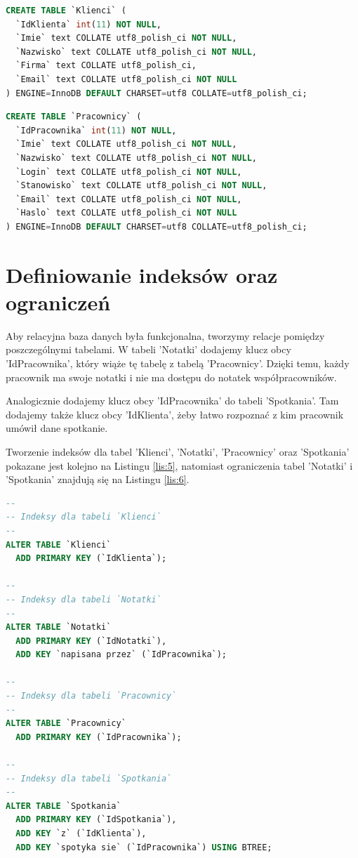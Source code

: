 \documentclass[eng,printmode,openany,oneside]{mgr}
\begin{document}
\begin{lstlisting}[caption={Stworzenie tabeli klientów}, language=SQL, label={lis:3}]
CREATE TABLE `Klienci` (
  `IdKlienta` int(11) NOT NULL,
  `Imie` text COLLATE utf8_polish_ci NOT NULL,
  `Nazwisko` text COLLATE utf8_polish_ci NOT NULL,
  `Firma` text COLLATE utf8_polish_ci,
  `Email` text COLLATE utf8_polish_ci NOT NULL
) ENGINE=InnoDB DEFAULT CHARSET=utf8 COLLATE=utf8_polish_ci;
\end{lstlisting}	
	
\begin{lstlisting}[caption={Stworzenie tabeli pracowników}, language=SQL, label={lis:4}]
CREATE TABLE `Pracownicy` (
  `IdPracownika` int(11) NOT NULL,
  `Imie` text COLLATE utf8_polish_ci NOT NULL,
  `Nazwisko` text COLLATE utf8_polish_ci NOT NULL,
  `Login` text COLLATE utf8_polish_ci NOT NULL,
  `Stanowisko` text COLLATE utf8_polish_ci NOT NULL,
  `Email` text COLLATE utf8_polish_ci NOT NULL,
  `Haslo` text COLLATE utf8_polish_ci NOT NULL
) ENGINE=InnoDB DEFAULT CHARSET=utf8 COLLATE=utf8_polish_ci;
\end{lstlisting}
	
	
	

	
	
	
\section{Definiowanie indeksów oraz ograniczeń}

Aby relacyjna baza danych była funkcjonalna, tworzymy relacje pomiędzy poszczególnymi tabelami. W tabeli 'Notatki' dodajemy klucz obcy 'IdPracownika', który wiąże tę tabelę z tabelą 'Pracownicy'. Dzięki temu, każdy pracownik ma swoje notatki i nie ma dostępu do notatek współpracowników.

Analogicznie dodajemy klucz obcy 'IdPracownika' do tabeli 'Spotkania'. Tam dodajemy także klucz obcy 'IdKlienta', żeby łatwo rozpoznać z kim pracownik umówił dane spotkanie.

Tworzenie indeksów dla tabel 'Klienci', 'Notatki', 'Pracownicy' oraz 'Spotkania' pokazane jest kolejno na Listingu \ref{lis:5}, natomiast ograniczenia tabel 'Notatki' i 'Spotkania' znajdują się na Listingu \ref{lis:6}.
	
	
\begin{lstlisting}[caption={Tworzenie indeksów dla tabel}, language=SQL, label={lis:5}]
--
-- Indeksy dla tabeli `Klienci`
--
ALTER TABLE `Klienci`
  ADD PRIMARY KEY (`IdKlienta`);

--
-- Indeksy dla tabeli `Notatki`
--
ALTER TABLE `Notatki`
  ADD PRIMARY KEY (`IdNotatki`),
  ADD KEY `napisana przez` (`IdPracownika`);

--
-- Indeksy dla tabeli `Pracownicy`
--
ALTER TABLE `Pracownicy`
  ADD PRIMARY KEY (`IdPracownika`);

--
-- Indeksy dla tabeli `Spotkania`
--
ALTER TABLE `Spotkania`
  ADD PRIMARY KEY (`IdSpotkania`),
  ADD KEY `z` (`IdKlienta`),
  ADD KEY `spotyka sie` (`IdPracownika`) USING BTREE;

\end{lstlisting}
	
\end{document}
